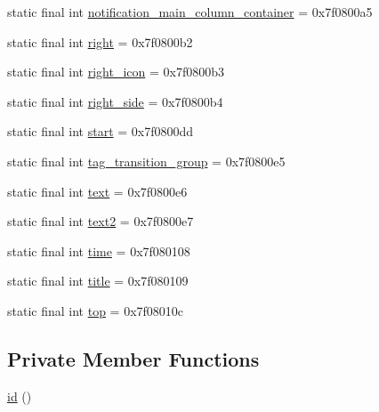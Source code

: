 \begin{DoxyCompactItemize}
\item 
static final int \mbox{\hyperlink{classandroid_1_1support_1_1graphics_1_1drawable_1_1animated_1_1_r_1_1id_a4659cfd56c99a93058be66facd12160d}{notification\+\_\+main\+\_\+column\+\_\+container}} = 0x7f0800a5
\item 
static final int \mbox{\hyperlink{classandroid_1_1support_1_1graphics_1_1drawable_1_1animated_1_1_r_1_1id_ae3d1db8c98a47c61bdc2984c578892e8}{right}} = 0x7f0800b2
\item 
static final int \mbox{\hyperlink{classandroid_1_1support_1_1graphics_1_1drawable_1_1animated_1_1_r_1_1id_a5289728033dea722cd93a2a5d2c36ed5}{right\+\_\+icon}} = 0x7f0800b3
\item 
static final int \mbox{\hyperlink{classandroid_1_1support_1_1graphics_1_1drawable_1_1animated_1_1_r_1_1id_aa9ac842f968caa43f844db5381d766ba}{right\+\_\+side}} = 0x7f0800b4
\item 
static final int \mbox{\hyperlink{classandroid_1_1support_1_1graphics_1_1drawable_1_1animated_1_1_r_1_1id_a4fc25752e74520b8034ec85efb8133d4}{start}} = 0x7f0800dd
\item 
static final int \mbox{\hyperlink{classandroid_1_1support_1_1graphics_1_1drawable_1_1animated_1_1_r_1_1id_a9a44132e906214f9e2ed43c3c076abad}{tag\+\_\+transition\+\_\+group}} = 0x7f0800e5
\item 
static final int \mbox{\hyperlink{classandroid_1_1support_1_1graphics_1_1drawable_1_1animated_1_1_r_1_1id_a771d3997393be396d7354a30b1a1ee64}{text}} = 0x7f0800e6
\item 
static final int \mbox{\hyperlink{classandroid_1_1support_1_1graphics_1_1drawable_1_1animated_1_1_r_1_1id_a9d7004b820a452d0cecbbb2e1a7655f7}{text2}} = 0x7f0800e7
\item 
static final int \mbox{\hyperlink{classandroid_1_1support_1_1graphics_1_1drawable_1_1animated_1_1_r_1_1id_a4c656a6a67db97db501a35937f7981a6}{time}} = 0x7f080108
\item 
static final int \mbox{\hyperlink{classandroid_1_1support_1_1graphics_1_1drawable_1_1animated_1_1_r_1_1id_a47a3e5ab1364d8adba942674f7c407ad}{title}} = 0x7f080109
\item 
static final int \mbox{\hyperlink{classandroid_1_1support_1_1graphics_1_1drawable_1_1animated_1_1_r_1_1id_a9ba6768ae53717c0d6be15c41b3d19ae}{top}} = 0x7f08010c
\end{DoxyCompactItemize}
\subsection*{Private Member Functions}
\begin{DoxyCompactItemize}
\item 
\mbox{\hyperlink{classandroid_1_1support_1_1graphics_1_1drawable_1_1animated_1_1_r_1_1id_a0bef099891978ee841daee05d4e127aa}{id}} ()
\end{DoxyCompactItemize}



